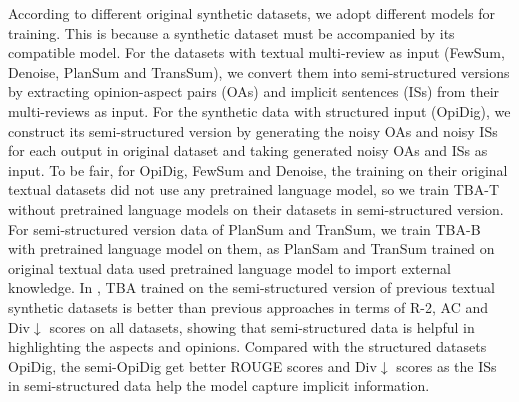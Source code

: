According to different original synthetic datasets, we adopt different models for training.
This is because a synthetic dataset must be accompanied by its compatible model.
For the datasets with textual multi-review as input (FewSum, Denoise, PlanSum and TransSum), 
we convert them into semi-structured versions by extracting 
opinion-aspect pairs (OAs) and implicit sentences (ISs)
from their multi-reviews as input.
For the synthetic data with structured input (OpiDig),
we construct its semi-structured version
by generating the noisy OAs and noisy ISs for each output in original dataset and taking generated noisy OAs and ISs as input.
To be fair, for OpiDig, FewSum and Denoise,
the training on their original textual datasets did not use any pretrained language model,
so we train TBA-T without pretrained language models on their datasets in semi-structured version.
For semi-structured version data of PlanSum and TranSum,
we train TBA-B with pretrained language model on them,
as PlanSam and TranSum trained on original textual data used pretrained language model to import external knowledge.
In ,
TBA trained on the semi-structured version of previous textual synthetic datasets
is better than previous approaches in terms of R-2, AC and Div$\downarrow$ scores on all datasets,
showing that semi-structured data
is helpful in highlighting the aspects and opinions.
Compared with the structured datasets OpiDig, the semi-OpiDig get better ROUGE scores and Div$\downarrow$ scores as the ISs in semi-structured data help the model capture implicit information.


